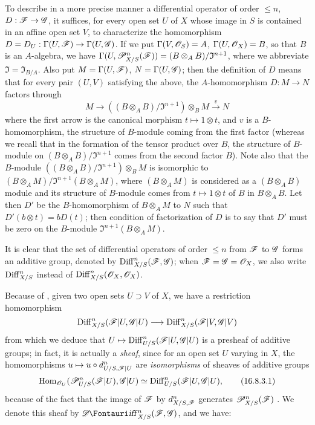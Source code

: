 \begin{env}[16.8.2]
\label{IV.16.8.2}
To describe in a more precise manner a differential operator of order $\leq n$, $D: \sh{F} \to \sh{G}$, it suffices, for every open set $U$ of $X$ whose image in $S$ is contained in an affine open set $V$, to characterize the homomorphism $D = D_U: \Gamma(U, \sh{F}) \to \Gamma(U, \sh{G})$.
If we put $\Gamma(V, \mathscr{O}_S) = A$, $\Gamma(U, \mathscr{O}_X) = B$, so that $B$ is an $A$-algebra, we have $\Gamma(U, \mathscr{P}_{X/S}^n(\mathscr{F}) ) = (B \otimes_A B)/\mathfrak{I}^{n+1}$, where we abbreviate $\mathfrak{I} = \mathfrak{I}_{B/A}$. 
Also put $M = \Gamma(U, \mathscr{F})$, $N = \Gamma(U, \mathscr{G})$;
then the definition of $D$ means that for every pair $(U,V)$ satisfying the above, the $A$-homomorphism $D:M \to N$ factors through
\[
  M \to ((B \otimes_A B)/\mathfrak{I}^{n+1}) \otimes_B M \xrightarrow{v} N
\]
where the first arrow is the canonical morphism $t \mapsto 1 \otimes t$, and $v$ is a $B$-homomorphism, the structure of $B$-module coming from the first factor (whereas we recall that in the formation of the tensor product over $B$, the structure of $B$-module on $(B \otimes_A B)/\mathfrak{I}^{n+1}$ comes from the second factor $B$).
Note also that the $B$-module $((B \otimes_A B)/\mathfrak{I}^{n+1}) \otimes_B M$ is isomorphic to $(B \otimes_A M)/\mathfrak{I}^{n+1}(B \otimes_A M)$, where $(B \otimes_A M)$ is considered as a $(B \otimes_A B)$ module and its structure of $B$-module comes from $t \mapsto 1 \otimes t$ of $B$ in $B \otimes_A B$.  
Let then $D'$ be the $B$-homomorphism of $B \otimes_A M$ to $N$ such that $D'(b \otimes t) = b D(t)$; then condition of factorization of $D$ is to say that $D'$ must be zero on the $B$-module $\mathfrak{I}^{n+1}(B \otimes_A M)$.
\end{env}

\begin{env}[16.8.3]
\label{IV.16.8.3}
It is clear that the set of differential operators of order $\leq n$ from $\mathscr{F}$ to $\mathscr{G}$ forms an additive group, denoted by $\operatorname{Diff}_{X/S}^n(\mathscr{F}, \mathscr{G})$;
when $\mathscr{F} = \mathscr{G} = \mathscr{O}_X$, we also write $\operatorname{Diff}_{X/S}^n$ instead of $\operatorname{Diff}_{X/S}^n(\mathscr{O}_X, \mathscr{O}_X)$.

Because of , given two open sets $U \supset V$ of $X$, we have a restriction homomorphism
\[
  \Diff_{X/S}^n(\sh{F}|U, \sh{G}|U) \to \Diff_{X/S}^n(\sh{F}|V, \sh{G}|V)
\]
from which we deduce that $U \mapsto \Diff_{U/S}^n(\sh{F}|U, \sh{G}|U)$ is a presheaf of additive groups;
in fact, it is actually a \emph{sheaf}, since for an open set $U$ varying in $X$, the homomorphisms $u \mapsto u \circ d_{U/S, \sh{F}|U}^n$ are \emph{isomorphisms} of sheaves of additive groups
\[
  \label{IV.16.8.3.1}
  \operatorname{Hom}_{\mathscr{O}_U}(\mathscr{P}_{U/S}^n(\mathscr{F}|U), \mathscr{G}|U) \simeq \operatorname{Diff}_{U/S}^n(\mathscr{F}|U, \mathscr{G}|U),
  \tag{16.8.3.1}
\]
because of the fact that the image of $\mathscr{F}$ by $d_{X/S, \mathscr{F}}^n$ generates $\mathscr{P}_{X/S}^n(\mathscr{F})$ .
We denote this sheaf by $\shDiff_{X/S}^n(\sh{F}, \sh{G})$, and we have:
\end{env}


